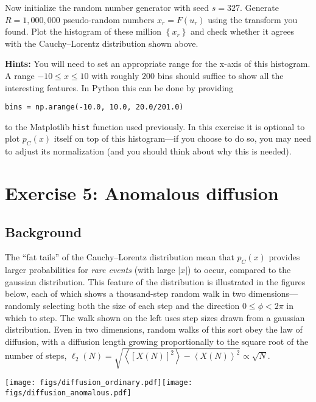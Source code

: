 \documentclass[12 pt]{article} %
\newcommand{\vev}[1]{\ensuremath{\left\langle #1 \right\rangle} }
\newcommand{\showmarks}[1]{\rightline{\texttt{[#1 marks]}}} %
\begin{document}
\showmarks{6}

Now initialize the random number generator with seed $s = 327$.
Generate $R = 1{,}000{,}000$ pseudo-random numbers $x_r = F(u_r)$ using the transform you found.
Plot the histogram of these million $\left\{x_r\right\}$ and check whether it agrees with the Cauchy--Lorentz distribution shown above.

\textbf{Hints:} You will need to set an appropriate range for the x-axis of this histogram.
A range $-10 \leq x \leq 10$ with roughly $200$ bins should suffice to show all the interesting features.
In Python this can be done by providing \\
\centerline{\texttt{bins = np.arange(-10.0, 10.0, 20.0/201.0)}}
to the Matplotlib \texttt{hist} function used previously.
In this exercise it is optional to plot $p_C(x)$ itself on top of this histogram---if you choose to do so, you may need to adjust its normalization (and you should think about why this is needed).

\showmarks{8}



\section*{Exercise 5: Anomalous diffusion}
\subsection*{Background}
The ``fat tails'' of the Cauchy--Lorentz distribution mean that $p_C(x)$ provides larger probabilities for \textit{rare events} (with large $|x|$) to occur, compared to the gaussian distribution.
This feature of the distribution is illustrated in the figures below, each of which shows a thousand-step random walk in two dimensions---randomly selecting both the size of each step and the direction $0 \leq \phi < 2\pi$ in which to step.
The walk shown on the left uses step sizes drawn from a gaussian distribution.
Even in two dimensions, random walks of this sort obey the law of diffusion, with a diffusion length growing proportionally to the square root of the number of steps, $\ell_2(N) = \sqrt{\vev{\left[X(N)\right]^2} - \vev{X(N)}^2} \propto \sqrt{N}$.

\noindent\texttt{[image: figs/diffusion\_ordinary.pdf]}\hfill \texttt{[image: figs/diffusion\_anomalous.pdf]}
\end{document}
